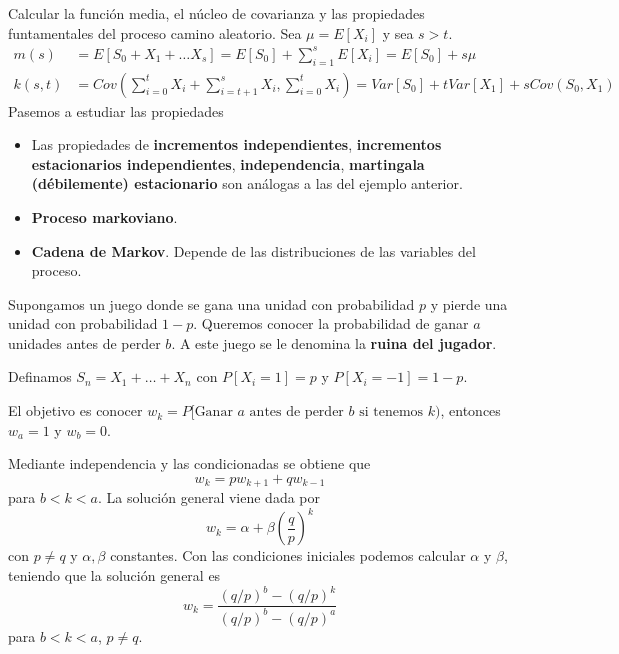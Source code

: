 \documentclass[PREyA.tex]{subfiles}
\begin{document}
\begin{example}
Calcular la función media, el núcleo de covarianza y las propiedades funtamentales del proceso camino aleatorio. Sea $\mu = E[X_i]$ y sea $s>t$.
\begin{align*}
m(s) &= E[S_0 +X_1 + \dotsc X_s] = E[S_0] + \sum_{i=1}^s E[X_i] = E[S_0] + s\mu\\
k(s,t) &=  Cov\left(\sum_{i=0}^t X_i + \sum_{i=t+1}^s X_i,\sum_{i=0}^t X_i \right) = Var[S_0] + tVar[X_1]+sCov(S_0,X_1)
\end{align*}
Pasemos a estudiar las propiedades
\begin{itemize}
\item Las propiedades de \textbf{incrementos independientes}, \textbf{incrementos estacionarios independientes}, \textbf{independencia}, \textbf{martingala} \textbf{(débilemente) estacionario} son análogas a las del ejemplo anterior.
\item \textbf{Proceso markoviano}. 
\item \textbf{Cadena de Markov}. Depende de las distribuciones de las variables del proceso.
\end{itemize}
\end{example}
\begin{defi} Supongamos un juego donde se gana una unidad con probabilidad $p$ y pierde una unidad con probabilidad $1-p$. Queremos conocer la probabilidad de ganar $a$ unidades antes de perder $b$. A este juego se le denomina la \textbf{ruina del jugador}.

Definamos $S_n = X_1 + \dotsc + X_n$ con $P[X_i = 1] = p$ y $P[X_i=-1] = 1-p$.

El objetivo es conocer $w_k = P[\text{Ganar $a$ antes de perder $b$ si tenemos $k$})$, entonces $w_a =1$ y $w_b = 0$. 
\end{defi}

\begin{prop}
Mediante independencia y las condicionadas se obtiene que
$$
w_k = pw_{k+1} + qw_{k-1} 
$$
para $b<k<a$. La solución general viene dada por
$$
w_k  = \alpha + \beta \left(\frac{q}{p}\right)^k 
$$
con $p \neq q$ y $\alpha,\beta$ constantes. Con las condiciones iniciales podemos calcular $\alpha$ y $\beta$, teniendo que la solución general es
$$
w_k = \frac{(q/p)^b - (q/p)^k}{(q/p)^b-(q/p)^a}
$$
para $b<k<a$, $p \neq q$.


\end{prop}
\end{document}
